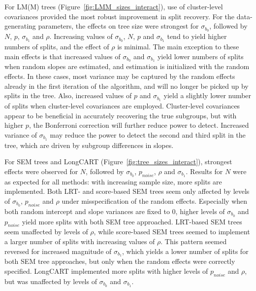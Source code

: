\documentclass[doc,floatsintext,natbib]{apa7}
\begin{document}
For LM(M) trees (Figure~\ref{fig:LMM_sizes_interact}), use of cluster-level covariances provided the most robust improvement in split recovery. For the data-generating parameters, the effects on tree size were strongest for $\sigma_{b_0}$, followed by $N$, $p$, $\sigma_{b_1}$ and $\rho$. Increasing values of $\sigma_{b_0}$, $N$, $p$ and $\sigma_{b_1}$ tend to yield higher numbers of splits, and the effect of $\rho$ is minimal. The main exception to these main effects is that increased values of $\sigma_{b_0}$ and $\sigma_{b_1}$ yield lower numbers of splits when random slopes are estimated, and estimation is initialized with the random effects. In these cases, most variance may be captured by the random effects already in the first iteration of the algorithm, and will no longer be picked up by splits in the tree. Also, increased values of $p$ and $\sigma_{b_1}$ yield a slightly lower number of splits when cluster-level covariances are employed. Cluster-level covariances appear to be beneficial in accurately recovering the true subgroups, but with higher $p$, the Bonferroni correction will further reduce power to detect. Increased variance of $\sigma_{b_1}$ may reduce the power to detect the second and third split in the tree, which are driven by subgroup differences in slopes.

For SEM trees and LongCART (Figure~\ref{fig:tree_sizes_interact}), strongest effects were observed for $N$, followed by $\sigma_{b_0}$, $p_{noise}$, $\rho$ and $\sigma_{b_1}$. Results for $N$ were as expected for all methods: with increasing sample size, more splits are implemented. Both LRT- and score-based SEM trees seem only affected by levels of $\sigma_{b_0}$, $p_{noise}$ and $\rho$ under misspecification of the random effects. Especially when both random intercept and slope variances are fixed to 0, higher levels of $\sigma_{b_0}$ and $p_{noise}$ yield more splits with both SEM tree approached. LRT-based SEM trees seem unaffected by levels of $\rho$, while score-based SEM trees seemed to implement a larger number of splits with increasing values of $\rho$. This pattern seemed reversed for increased magnitude of $\sigma_{b_1}$, which yields a lower number of splits for both SEM tree approaches, but only when the random effects were correctly specified. LongCART implemented more splits with higher levels of $p_{noise}$ and $\rho$, but was unaffected by levels of $\sigma_{b_0}$ and $\sigma_{b_1}$.
\end{document}
